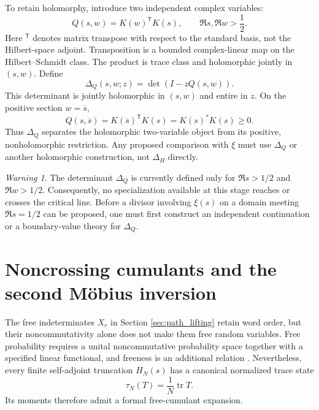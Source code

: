 \documentclass[11pt]{amsart}
\numberwithin{equation}{section}
\theoremstyle{plain}
\theoremstyle{definition}
\theoremstyle{remark}
\newtheorem{warning}[theorem]{Warning}
\newcommand{\tr}{\operatorname{tr}}
\begin{document}
To retain holomorphy, introduce two independent complex variables:
\begin{equation}
Q(s,w)=K(w)^{\mathsf T}K(s),
\qquad \Re s,\Re w>\frac12.
\label{eq:Q_two_variable}
\end{equation}
Here $^{\mathsf T}$ denotes matrix transpose with respect to the standard basis, not the Hilbert-space adjoint.  Transposition is a bounded complex-linear map on the Hilbert--Schmidt class.  The product is trace class and holomorphic jointly in $(s,w)$.  Define
\begin{equation}
\Delta_Q(s,w;z)=\det(I-zQ(s,w)).
\label{eq:Q_determinant}
\end{equation}
This determinant is jointly holomorphic in $(s,w)$ and entire in $z$.
On the positive section $w=\overline s$,
\begin{equation}
Q(s,\overline s)=K(\overline s)^{\mathsf T}K(s)=K(s)^*K(s)\ge0.
\label{eq:Q_positive_section}
\end{equation}
Thus $\Delta_Q$ separates the holomorphic two-variable object from its positive, nonholomorphic restriction.  Any proposed comparison with $\xi$ must use $\Delta_Q$ or another holomorphic construction, not $\Delta_H$ directly.

\begin{warning}
\label{warn:two_variable_domain}
The determinant $\Delta_Q$ is currently defined only for $\Re s>1/2$ and $\Re w>1/2$.  Consequently, no specialization available at this stage reaches or crosses the critical line.  Before a divisor involving $\xi(s)$ on a domain meeting $\Re s=1/2$ can be proposed, one must first construct an independent continuation or a boundary-value theory for $\Delta_Q$.
\end{warning}


\section{Noncrossing cumulants and the second M\"obius inversion}
\label{sec:noncrossing_cumulants}

The free indeterminates $X_r$ in Section \ref{sec:path_lifting} retain word order, but their noncommutativity alone does not make them free random variables.  Free probability requires a unital noncommutative probability space together with a specified linear functional, and freeness is an additional relation \cite{VoiculescuDykemaNica1992,NicaSpeicher2006}.  Nevertheless, every finite self-adjoint truncation $H_N(s)$ has a canonical normalized trace state
\begin{equation}
\tau_N(T)=\frac1N\tr T.
\label{eq:normalized_trace_state}
\end{equation}
Its moments therefore admit a formal free-cumulant expansion.
\end{document}
